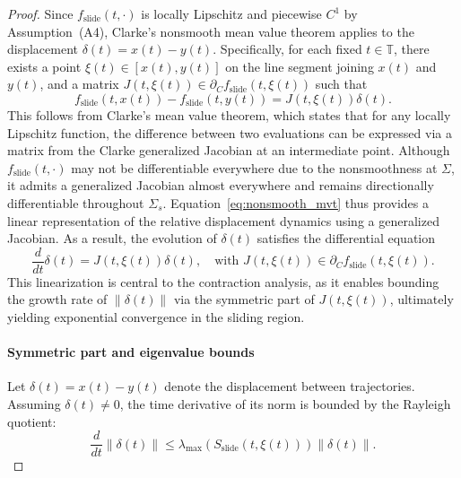 \documentclass[11pt]{article}
\begin{document}
\begin{proof}
Since \( f_{\mathrm{slide}}(t,\cdot) \) is locally Lipschitz and piecewise \( C^1 \) by Assumption~(A4), Clarke's nonsmooth mean value theorem applies to the displacement \( \delta(t) = x(t) - y(t) \). Specifically, for each fixed \( t \in \mathbb{T} \), there exists a point \( \xi(t) \in [x(t), y(t)] \) on the line segment joining \( x(t) \) and \( y(t) \), and a matrix \( J(t, \xi(t)) \in \partial_C f_{\mathrm{slide}}(t, \xi(t)) \) such that
\begin{equation} \label{eq:nonsmooth_mvt}
	f_{\mathrm{slide}}(t, x(t)) - f_{\mathrm{slide}}(t, y(t)) = J(t, \xi(t)) \delta(t).
\end{equation}
This follows from Clarke’s mean value theorem, which states that for any locally Lipschitz function, the difference between two evaluations can be expressed via a matrix from the Clarke generalized Jacobian at an intermediate point. Although \( f_{\mathrm{slide}}(t,\cdot) \) may not be differentiable everywhere due to the nonsmoothness at \( \Sigma \), it admits a generalized Jacobian almost everywhere and remains directionally differentiable throughout \( \Sigma_s \). Equation~\eqref{eq:nonsmooth_mvt} thus provides a linear representation of the relative displacement dynamics using a generalized Jacobian. As a result, the evolution of \( \delta(t) \) satisfies the differential equation
\begin{equation} \label{eq:delta_dot_sliding}
	\frac{d}{dt} \delta(t) = J(t, \xi(t)) \delta(t), \quad \text{with } J(t, \xi(t)) \in \partial_C f_{\mathrm{slide}}(t, \xi(t)).
\end{equation}
This linearization is central to the contraction analysis, as it enables bounding the growth rate of \( \|\delta(t)\| \) via the symmetric part of \( J(t, \xi(t)) \), ultimately yielding exponential convergence in the sliding region.



\paragraph{Symmetric part and eigenvalue bounds}

Let \( \delta(t) = x(t) - y(t) \) denote the displacement between trajectories. Assuming \( \delta(t) \neq 0 \), the time derivative of its norm is bounded by the Rayleigh quotient:
\begin{equation} \label{eq:delta_norm_bound_slide}
	\frac{d}{dt} \|\delta(t)\| \leq \lambda_{\max}\left( S_{\mathrm{slide}}(t, \xi(t)) \right) \|\delta(t)\|.
\end{equation}


\end{proof}
\end{document}
